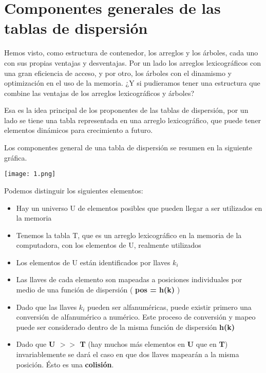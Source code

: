 \section{Componentes generales de las tablas de dispersión}
\label{sec:comp-gener-de}

Hemos visto, como estructura de contenedor, los arreglos y los
árboles, cada uno con sus propias ventajas y desventajas.  Por un lado
los arreglos lexicográficos con una gran eficiencia de acceso, y
por otro, los árboles con el dinamismo y optimización en el uso de la
memoria.  ¿Y si pudieramos tener una estructura que combine las
ventajas de los arreglos lexicográficos y árboles?

Esa es la idea principal de los proponentes de las tablas de
dispersión, por un lado se tiene una tabla representada en una arreglo
lexicográfico, que puede tener elementos dinámicos para crecimiento a
futuro.

Los componentes general de una tabla de dispersión se resumen en la
siguiente gráfica.

\begin{center}
  \texttt{[image: 1.png]}
\end{center}

Podemos distinguir los siguientes elementos:

\begin{itemize}
\item Hay un universo U de elementos posibles que pueden llegar a ser
  utilizados en la memoria
\item Tenemos la tabla T, que es un arreglo lexicográfico en la
  memoria de la computadora, con los elementos de U, realmente
  utilizados
\item Los elementos de U están identificados por llaves $k_i$
\item Las llaves de cada elemento son mapeadas a posiciones
  individuales por medio de una función de dispersión ( \textbf{pos =
    h(k)} )
\item Dado que las llaves $k_i$ pueden ser alfanuméricas, puede existir
  primero una conversión de alfanumérico a numérico.  Este proceso de
  conversión y mapeo puede ser considerado dentro de la misma función
  de dispersión \textbf{h(k)}
\item Dado que \textbf{U $>>$ T} (hay muchos más elementos en \textbf{U}
  que en \textbf{T}) invariablemente se dará el caso en que dos llaves
  mapearán a la misma posición.  Ésto es una \textbf{colisión}.
\end{itemize}

